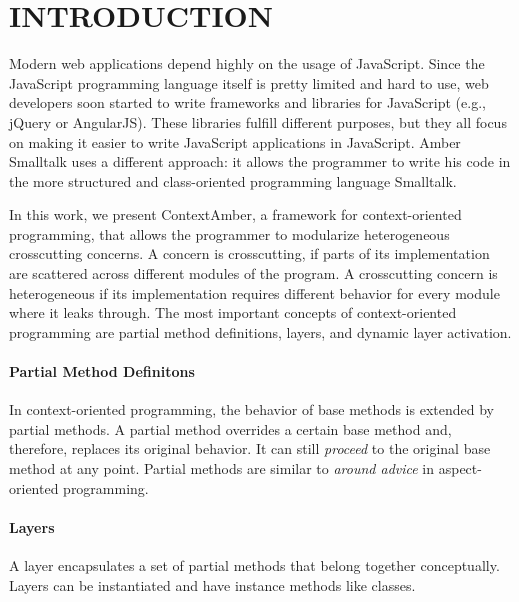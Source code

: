\documentclass{sig-alternate}
\begin{document}



\section{INTRODUCTION}
Modern web applications depend highly on the usage of JavaScript. Since the JavaScript programming language itself is pretty limited and hard to use, web developers soon started to write frameworks and libraries for JavaScript (e.g., jQuery or AngularJS). These libraries fulfill different purposes, but they all focus on making it easier to write JavaScript applications in JavaScript. Amber Smalltalk uses a different approach: it allows the programmer to write his code in the more structured and class-oriented programming language Smalltalk.

In this work, we present ContextAmber, a framework for context-oriented programming, that allows the programmer to modularize heterogeneous crosscutting concerns. A concern is crosscutting, if parts of its implementation are scattered across different modules of the program. A crosscutting concern is heterogeneous if its implementation requires different behavior for every module where it leaks through. The most important concepts of context-oriented programming are partial method definitions, layers, and dynamic layer activation.

\paragraph{Partial Method Definitons}
In context-oriented programming, the behavior of base methods is extended by partial methods. A partial method overrides a certain base method and, therefore, replaces its original behavior. It can still \emph{proceed} to the original base method at any point. Partial methods are similar to \emph{around advice} in aspect-oriented programming.

\paragraph{Layers}
A layer encapsulates a set of partial methods that belong together conceptually. Layers can be instantiated and have instance methods like classes.
\end{document}
